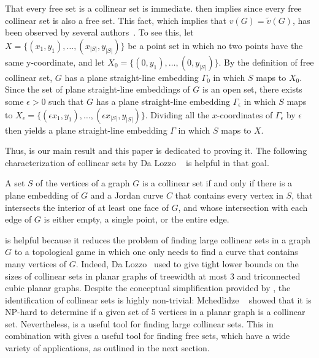 That every free set is a collinear set is immediate.  then implies  since every free collinear set is also a free set. 
This fact, which implies that $v(G)=\tilde{v}(G)$, has been observed by several
authors~\cite{bose.dujmovic.ea:polynomial,dalozzo.dujmovic.ea:drawing,dujmovic:utility,gkossw-upg-09}. To
see this,
let $X=\{(x_1,y_1),\ldots,(x_{|S|},y_{|S|})\}$ be a point set in which
no two points have the same y-coordinate, and let
$X_0=\{(0,y_1),\ldots,(0,y_{|S|})\}$.  By the definition of free
collinear set, $G$ has a plane straight-line embedding $\Gamma_0$ in
which $S$ maps to $X_0$.  Since the set of plane straight-line embeddings of
$G$ is an open set, there exists some $\epsilon >0$ such that $G$ has a
plane straight-line embedding $\Gamma_{\epsilon}$ in which $S$ maps to
$X_\epsilon=\{(\epsilon x_1,y_1),\ldots,(\epsilon x_{|S|},y_{|S|})\}$.
Dividing all the $x$-coordinates of $\Gamma_\epsilon$ by $\epsilon$ then
yields a plane straight-line embedding $\Gamma$ in which $S$ maps to
$X$. 

Thus,  is our main result and this paper is dedicated to
proving it. The following
characterization of collinear sets by Da Lozzo \etal\
\cite{dalozzo.dujmovic.ea:drawing}  is helpful in that goal.

\begin{thm}\cite{dalozzo.dujmovic.ea:drawing} 
	A set $S$ of the vertices of a graph $G$ is a collinear set if and
	only if there is a plane embedding of $G$ and a Jordan curve $C$
	that contains every vertex in $S$, that intersects the interior of
	at least one face of $G$, and whose intersection with
	each edge of $G$ is either empty, a single point, or the entire edge.
\end{thm}

  is helpful because it reduces the problem of
finding large collinear sets in a graph $G$ to a topological game in
which one only needs to find a curve that contains many vertices
of $G$.  Indeed, Da Lozzo \etal\ used \thmref{collinear-set} to give
tight lower bounds on the sizes of collinear sets in planar graphs
of treewidth at most 3 and triconnected cubic planar graphs. Despite the conceptual simplification provided by ,
the identification of collinear sets is highly non-trivial:  Mchedlidze
\etal\ \cite{mchedlidze.radermacher.ea:aligned} showed that it is NP-hard to
determine if a given set of 5 vertices in a planar graph is a collinear
set.
%
Nevertheless,  is a useful tool for finding large 
collinear sets. This in combination with \corref{our-all} gives a useful
tool for finding free sets, which have a wide variety of applications,
as outlined in the next section.


